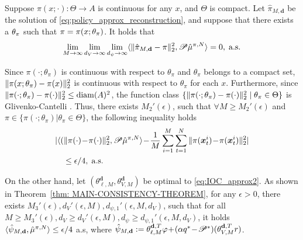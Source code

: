 \begin{corollary}
Suppose $\pi(x;\cdot):\Theta\rightarrow A$ is continuous for any $x$, and $\Theta$ is compact. 
    Let $\hat\pi_{M,\mathbf{d}}$ be the solution of \eqref{eq:policy_approx_reconstruction}, and suppose that there exists a $\theta_{\relax{\pi}}$ such that $\relax{\pi}=\pi(x;\theta_{\relax{\pi}})$. It holds that
    \begin{align*}
        \lim_{M\rightarrow\infty}\lim_{d_V\rightarrow\infty}\lim_{d_\psi\rightarrow\infty}\langle \|\hat\pi_{M,\mathbf{d}}-\relax{\pi}\|_2^2, \mathscr{P}\hat\mu^{\relax{\pi},N} \rangle = 0,\;\text{a.s.}
    \end{align*}
\end{corollary}
\begin{pf}
    Since $\pi(\cdot;\theta_\pi)$ is continuous with respect to $\theta_\pi$ and $\theta_\pi$ belongs to a compact set, $\|\pi(x;\theta_\pi)-\relax{\pi}(x)\|_2^2$ is continuous with respect to $\theta_\pi$ for each $x$. 
    Furthermore, since $\|\pi(\cdot;\theta_\pi)-\relax{\pi}(\cdot)\|_2^2\leq\operatorname*{diam}(A)^2$, the function class $\{\|\pi(\cdot;\theta_\pi)-\relax{\pi}(\cdot)\|_2^2 \mid \theta_\pi\in \Theta\}$ is Glivenko-Cantelli \citep[E.g.~19.8, p.~272]{van1998asymptotic}. Thus, there exists $M_2'(\epsilon)$, such that $\forall M\geq M_2'(\epsilon)$ and $\pi\in\{\pi(\cdot;\theta_\pi)|\theta_\pi\in \Theta\}$, the following inequality holds
    \begin{align}
       & |\langle (\|\pi(\cdot)\!-\!\relax{\pi}(\cdot)\|_2^2, \mathscr{P}\hat\mu^{\relax{\pi},N} \rangle\! -\! \frac{1}{M}\sum_{i=1}^M\sum_{t=1}^N \|\pi(\bm{x}_{t}^i)\!-\!\relax{\pi}(\bm{x}_{t}^i)\|_2^2|\nonumber\\
       & \quad \leq \epsilon/4,\;  \mbox{a.s.}
        \label{eq:pi_ulln}
    \end{align}

    On the other hand, let $(\theta_{\ell, M}^{\mathbf{d}}, \theta_{V, M}^{\mathbf{d}})$ be optimal to \eqref{eq:IOC_approx2}. 
    As shown in Theorem~\ref{thm: MAIN-CONSISTENCY-THEOREM}, for any $\epsilon >0$, there exists $M_3'(\epsilon), d_V'(\epsilon, M), d_{\psi,1}'(\epsilon, M, d_V)$, such that for all $M\geq M_3'(\epsilon), d_V\geq d_V'(\epsilon, M), d_\psi \geq d_{\psi,1}'(\epsilon, M, d_V)$, it holds $\langle\hat\psi_{M,\mathbf{d}}, \hat{\mu}^{\relax{\pi},N} \rangle \leq \epsilon/4$ a.s, 
    where $\hat\psi_{M,\mathbf{d}}:=\theta_{\ell, M}^{\mathbf{d},T}\varphi\!+\!(\alpha q^*\!-\!\mathscr{P}^*)(\theta_{V, M}^{\mathbf{d},T}r)$.


\end{pf}
